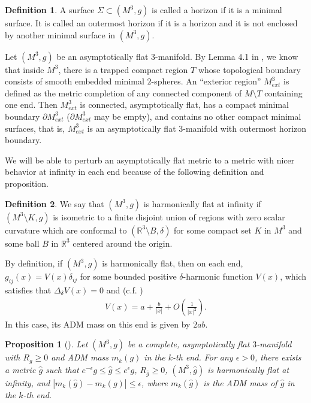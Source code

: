 \documentclass[letter]{amsart}
\newtheorem{prop}[thm]{Proposition}
\theoremstyle{definition}
\newtheorem{defn}{Definition}[section]
\theoremstyle{remark}
\begin{document}
\begin{defn}
	A surface $\Sigma \subset (M^3, g)$ is called a horizon if it is a minimal surface. It is called an outermost horizon if it is a horizon and it is not enclosed by another minimal surface in $(M^3, g)$.
\end{defn}

Let $(M^3, g)$ be an asymptotically flat  $3$-manifold. By Lemma 4.1 in \cite{HI'01}, we know that inside $M^3$, there is a trapped compact region $T$ whose topological boundary consists of smooth embedded minimal $2$-spheres. An ``exterior region'' $M^3_{ext}$ is defined as the metric completion of any connected component of $M \setminus T$ containing one end. Then $M^3_{ext}$ is connected, asymptotically flat, has a compact minimal boundary $\partial M^3_{ext}$ ($\partial M^3_{ext}$ may be empty), and contains no other compact minimal surfaces, that is, $M^3_{ext}$ is an asymptotically flat $3$-manifold with outermost horizon boundary.

We will be able to perturb an asymptotically flat metric to a metric with nicer behavior at infinity in each end because of the following definition and proposition.

\begin{defn}
	We say that $(M^3, g)$ is harmonically flat at infinity if $(M^3 \setminus K, g)$ is isometric to a finite disjoint union of regions with zero scalar curvature which are conformal to $(\mathbb{R}^3 \setminus B, \delta)$ for some compact set $K$ in $M^3$ and some ball $B$ in $\mathbb{R}^3$ centered around the origin.
\end{defn}
By definition, if $(M^3, g)$ is harmonically flat, then on each end, $g_{ij}(x)= V(x) \delta _{ij}$ for some bounded positive $\delta $-harmonic function $V(x)$, which satisfies that $\Delta _{\delta } V(x) =0$ and (c.f. \cite[Equation (10)]{Bray'01})
\begin{align}\label{V-expan}
	V(x) = a + \frac{b}{|x|} + O\left(\frac{1}{|x|^2}\right).
\end{align} 
In this case, its ADM mass on this end is given by $2ab$.


\begin{prop}[{\cite{SY'81}}]\label{hf-apprx}
	Let $(M^3,g)$ be a complete, asymptotically flat $3$-manifold with $R_g \geq 0$ and ADM mass $m_k(g)$ in the $k$-th end. For any $\epsilon >0$, there exists a metric $\hat{g}$ such that $e^{-\epsilon }g \leq \hat{g} \leq e^{\epsilon }g$, $R_{\hat{g}} \geq 0$, $(M^3, \hat{g})$ is harmonically flat at infinity, and $|m_k(\hat{g}) - m_k(g)| \leq \epsilon $, where $m_k(\hat{g})$ is the ADM mass of $\hat{g}$ in the $k$-th end.
\end{prop}
\end{document}
